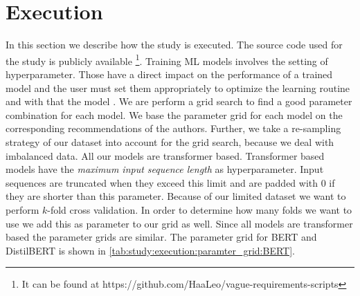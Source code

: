 \section{Execution}
\label{chp:study:sec:execution}
In this section we describe how the study is executed.
The source code used for the study is publicly available \footnote{It can be found at https://github.com/HaaLeo/vague-requirements-scripts}.
Training \ac{ML} models involves the setting of hyperparameter.
Those have a direct impact on the performance of a trained model and the user must set them appropriately to optimize the learning routine and with that the model \parencite{Claesen:2015}.
We are perform a grid search to find a good parameter combination for each model.
We base the parameter grid for each model on the corresponding recommendations of the authors.
Further, we take a re-sampling strategy of our dataset into account for the grid search, because we deal with imbalanced data.
All our models are transformer based.
Transformer based models have the \textit{maximum input sequence length} as hyperparameter.
Input sequences are truncated when they exceed this limit and are padded with 0 if they are shorter than this parameter.
Because of our limited dataset we want to perform $k$-fold cross validation.
In order to determine how many folds we want to use we add this as parameter to our grid as well.
Since all models are transformer based the parameter grids are similar.
The parameter grid for \ac{BERT} and \ac{DistilBERT} is shown in \cref{tab:study:execution:paramter_grid:BERT}.
